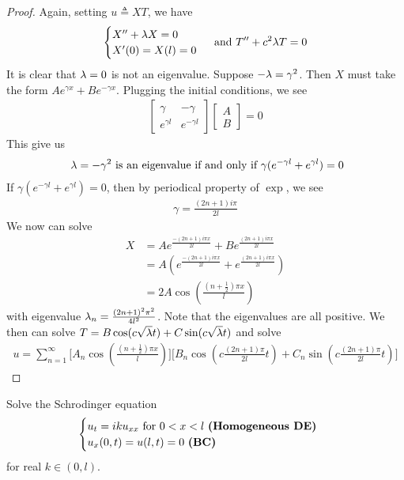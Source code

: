 \documentclass{report}
\begin{document}
\begin{proof}
Again, setting $u\triangleq XT$, we have 
\begin{align*}
\begin{cases}
  X''+\lambda X=0 \\
  X'(0)=X(l)=0
\end{cases} \text{ and }T''+c^2 \lambda T=0
\end{align*}
It is clear that $\lambda =0$ is not an eigenvalue. Suppose $-\lambda = \gamma ^2$. Then $X$ must take the form  $Ae^{\gamma x}+Be^{-\gamma x}$. Plugging the initial conditions, we see 
\begin{align*}
\begin{bmatrix}
  \gamma & -\gamma \\
  e^{\gamma l}& e^{-\gamma l} 
\end{bmatrix} \begin{bmatrix}
A\\
B
\end{bmatrix}=0
\end{align*}
This give us 
\begin{align*}
\text{ $\lambda =-\gamma ^2$ is an eigenvalue if and only if }\gamma (e^{-\gamma l}+e^{\gamma l})=0
\end{align*}
If $\gamma (e^{-\gamma l}+e^{\gamma l})=0$, then by periodical property of $\exp$, we see 
\begin{align*}
\gamma = \frac{(2n+1)i \pi }{2l}
\end{align*}
We now can solve 
\begin{align*}
X&= Ae^{\frac{-(2n+1)i \pi x}{2l}} + Be^{\frac{(2n+1)i\pi x}{2l}} \\
&= A(e^{\frac{-(2n+1)i \pi x}{2l}}+e^{\frac{(2n+1)i\pi x }{2l}}) \\
&=2A \cos (\frac{(n+\frac{1}{2})\pi  x}{l}) 
\end{align*}
with eigenvalue $\lambda_n=\frac{(2n+1)^2\pi ^2}{4l^2}$. Note that the eigenvalues are all positive. We then can solve $T=B\cos (c \sqrt{\lambda } t)+C \sin (c\sqrt{\lambda }t )$ and solve 
\begin{align*}
u=\sum_{n=1}^{\infty} \big[A_n \cos (\frac{(n+\frac{1}{2})\pi x}{l}) \big] \big[B_n \cos (c \frac{(2n+1)\pi }{2l}t)+C_n \sin(c \frac{(2n+1)\pi }{2l}t) \big]
\end{align*}
\end{proof}
\begin{question}{}{}
Solve the Schrodinger equation 
\begin{align*}
\begin{cases}
  u_t=iku_{xx}\text{ for }0<x<l\text{ \textbf{(Homogeneous DE)} } \\
  u_x(0,t)=u(l,t)=0\text{ \textbf{(BC)} }
\end{cases}
\end{align*}
for real $k \in (0,l)$. 
\end{question}
\end{document}
